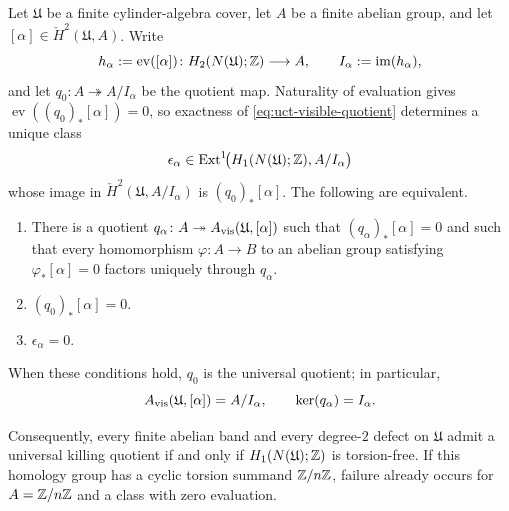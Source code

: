 \begin{theorem}
\label{thm:intrinsic-visible-quotient}
Let $\mathfrak{U}$ be a finite cylinder-algebra cover, let $A$ be a finite
abelian group, and let
$[\alpha]\in\check{H}^2(\mathfrak{U},A)$.  Write
\[
h_\alpha:=\operatorname{ev}([\alpha])\colon
H_2(N(\mathfrak{U});\mathbb{Z})\longrightarrow A,
\qquad
I_\alpha:=\operatorname{im}(h_\alpha),
\]
and let $q_0\colon A\twoheadrightarrow A/I_\alpha$ be the quotient map.
Naturality of evaluation gives
$\operatorname{ev}((q_0)_*[\alpha])=0$, so exactness of
\eqref{eq:uct-visible-quotient} determines a unique class
\begin{equation}\label{eq:residual-extension-class}
\epsilon_\alpha\in
\operatorname{Ext}^1\!\bigl(H_1(N(\mathfrak{U});\mathbb{Z}),A/I_\alpha\bigr)
\end{equation}
whose image in $\check{H}^2(\mathfrak{U},A/I_\alpha)$ is
$(q_0)_*[\alpha]$.  The following are equivalent.
\begin{enumerate}[label=\textup{(\arabic*)}]
\item There is a quotient $q_\alpha\colon A\twoheadrightarrow A_{\mathrm{vis}}(\mathfrak{U},[\alpha])$ such that
$(q_\alpha)_*[\alpha]=0$ and such that every homomorphism
$\varphi\colon A\to B$ to an abelian group satisfying
$\varphi_*[\alpha]=0$ factors uniquely through $q_\alpha$.
\item $(q_0)_*[\alpha]=0$.
\item $\epsilon_\alpha=0$.
\end{enumerate}
When these conditions hold, $q_0$ is the universal quotient; in particular,
\begin{equation}\label{eq:visible-kernel-cycle-image}
A_{\mathrm{vis}}(\mathfrak{U},[\alpha])=A/I_\alpha,
\qquad
\ker(q_\alpha)=I_\alpha.
\end{equation}

Consequently, every finite abelian band and every degree-$2$ defect on
$\mathfrak{U}$ admit a universal killing quotient if and only if
$H_1(N(\mathfrak{U});\mathbb{Z})$ is torsion-free.  If this homology group has a
cyclic torsion summand $\mathbb{Z}/n\mathbb{Z}$, failure already occurs for
$A=\mathbb{Z}/n\mathbb{Z}$ and a class with zero evaluation.
\end{theorem}

